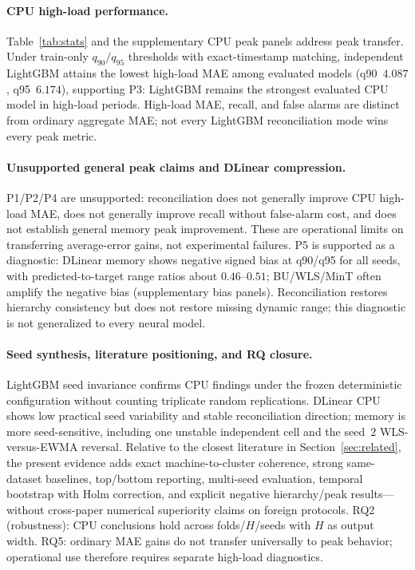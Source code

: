 \documentclass[a4paper,fleqn]{cas-dc}
\begin{document}
\paragraph{{CPU} high-load performance.}
Table~\ref{tab:stats} and the supplementary {CPU} peak panels address peak
transfer.
Under train-only $q_{90}/q_{95}$ thresholds with exact-timestamp matching,
independent LightGBM attains the lowest high-load {MAE} among evaluated models
(q90~$4.087$, q95~$6.174$), supporting P3: LightGBM remains the strongest
evaluated {CPU} model in high-load periods.
High-load {MAE}, recall, and false alarms are distinct from ordinary aggregate
{MAE}; not every LightGBM reconciliation mode wins every peak metric.

\paragraph{Unsupported general peak claims and DLinear compression.}
P1/P2/P4 are unsupported: reconciliation does not generally improve {CPU}
high-load {MAE}, does not generally improve recall without false-alarm cost, and
does not establish general memory peak improvement.
These are operational limits on transferring average-error gains, not
experimental failures.
P5 is supported as a diagnostic: DLinear memory shows negative signed bias at
q90/q95 for all seeds, with predicted-to-target range ratios about $0.46$--$0.51$;
BU/{WLS}/MinT often amplify the negative bias (supplementary bias panels).
Reconciliation restores hierarchy consistency but does not restore missing
dynamic range; this diagnostic is not generalized to every neural model.

\paragraph{Seed synthesis, literature positioning, and {RQ} closure.}
LightGBM seed invariance confirms {CPU} findings under the frozen deterministic
configuration without counting triplicate random replications.
DLinear {CPU} shows low practical seed variability and stable reconciliation
direction; memory is more seed-sensitive, including one unstable independent
cell and the seed~$2$ {WLS}-versus-{EWMA} reversal.
Relative to the closest literature in Section~\ref{sec:related}, the present
evidence adds exact machine-to-cluster coherence, strong same-dataset baselines,
top/bottom reporting, multi-seed evaluation, temporal bootstrap with Holm
correction, and explicit negative hierarchy/peak results---without cross-paper
numerical superiority claims on foreign protocols.
{RQ2} (robustness): {CPU} conclusions hold across folds/$H$/seeds with $H$ as
output width.
{RQ5}: ordinary {MAE} gains do not transfer universally to peak behavior;
operational use therefore requires separate high-load diagnostics.
\end{document}
